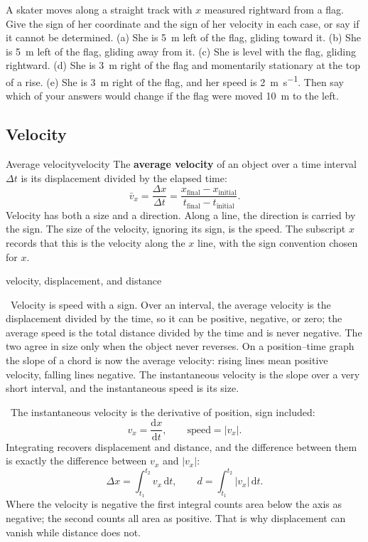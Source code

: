 \documentclass[11pt,twoside,openany]{book}
\newcommand{\dd}{\mathrm{d}}
\newcommand{\deriv}[2]{\frac{\dd #1}{\dd #2}}
\newcounter{check}[chapter]
\newcommand{\viewtag}[3]{\fcolorbox{#2}{#3}{\footnotesize\textbf{\textcolor{#2}{#1}}}}
\newcommand{\elemtag}{\viewtag{Elementary}{elemcol}{elempale}}
\newcommand{\calctag}{\viewtag{Calculus}{calccol}{calcpale}}
\newcommand{\elem}{\par\medskip\noindent\elemtag\ }
\newcommand{\calc}{\par\medskip\noindent\calctag\ }
\begin{document}
\begin{checkbox}
A skater moves along a straight track with $x$ measured rightward from a flag. Give the sign of her coordinate and the sign of her velocity in each case, or say if it cannot be determined. (a) She is \SI{5}{\metre} left of the flag, gliding toward it. (b) She is \SI{5}{\metre} left of the flag, gliding away from it. (c) She is level with the flag, gliding rightward. (d) She is \SI{3}{\metre} right of the flag and momentarily stationary at the top of a rise. (e) She is \SI{3}{\metre} right of the flag, and her speed is \SI{2}{\metre\per\second}. Then say which of your answers would change if the flag were moved \SI{10}{\metre} to the left.
\end{checkbox}

\subsection{Velocity}

\begin{definition}{Average velocity}{velocity}
The \textbf{average velocity} of an object over a time interval $\Delta t$ is its displacement divided by the elapsed time:
\[
\bar v_x = \frac{\Delta x}{\Delta t} = \frac{x_{\text{final}} - x_{\text{initial}}}{t_{\text{final}} - t_{\text{initial}}}.
\]
Velocity has both a size and a direction. Along a line, the direction is carried by the sign. The size of the velocity, ignoring its sign, is the speed. The subscript $x$ records that this is the velocity along the $x$ line, with the sign convention chosen for $x$.
\end{definition}

\begin{twoviews}{velocity, displacement, and distance}
\elem Velocity is speed with a sign. Over an interval, the average velocity is the displacement divided by the time, so it can be positive, negative, or zero; the average speed is the total distance divided by the time and is never negative. The two agree in size only when the object never reverses. On a position--time graph the slope of a chord is now the average velocity: rising lines mean positive velocity, falling lines negative. The instantaneous velocity is the slope over a very short interval, and the instantaneous speed is its size.

\calc The instantaneous velocity is the derivative of position, sign included:
\[
v_x = \deriv{x}{t}, \qquad \text{speed} = |v_x|.
\]
Integrating recovers displacement and distance, and the difference between them is exactly the difference between $v_x$ and $|v_x|$:
\[
\Delta x = \int_{t_1}^{t_2} v_x\,\dd t, \qquad d = \int_{t_1}^{t_2} |v_x|\,\dd t.
\]
Where the velocity is negative the first integral counts area below the axis as negative; the second counts all area as positive. That is why displacement can vanish while distance does not.
\end{twoviews}
\end{document}
